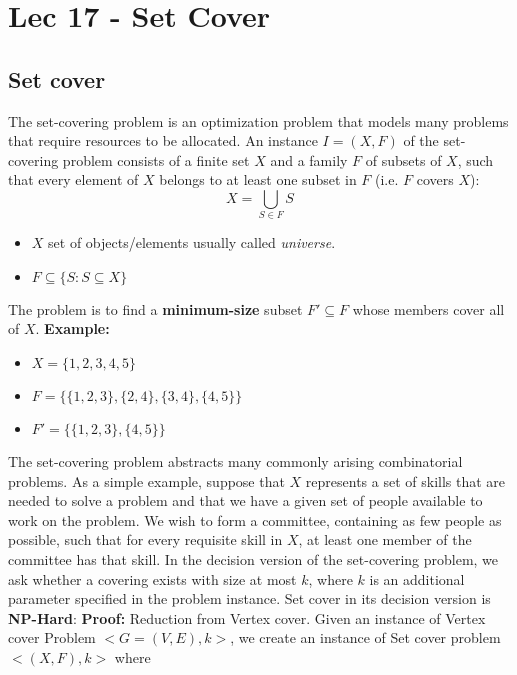 \chapter{Lec 17 - Set Cover}

\section{Set cover}
The set-covering problem is an optimization problem that models many problems that require resources to be allocated. An instance $I = (X, F)$ of the set-covering problem consists of a finite set $X$ and a family $F$ of subsets of $X$, such that every element of $X$ belongs to at least one subset in $F$ (i.e. $F$ covers $X$):
\[X = \bigcup_{S \in F}S\]
\begin{itemize}
    \item $X$ set of objects/elements usually called \textit{universe}.

    \item $F \subseteq \{S : S \subseteq X\}$
\end{itemize}
The problem is to find a \textbf{minimum-size} subset $F' \subseteq F$ whose members cover all of $X$.\newline\newline
\textbf{Example:}
\begin{itemize}
    \item $X = \{1,2,3,4,5\}$
    \item  $F = \{\{1,2,3\}, \{2,4\}, \{3,4\}, \{4,5\}\}$
    \item  $F' = \{\{1,2,3\}, \{4,5\}\}$
\end{itemize}
The set-covering problem abstracts many commonly arising combinatorial problems. As a simple example, suppose that $X$ represents a set of skills that are needed to solve a problem and that we have a given set of people available to work on the problem. We wish to form a committee, containing as few people as possible, such that for every requisite skill in $X$, at least one member of the committee has that skill. In the decision version of the set-covering problem, we ask whether a covering exists with size at most $k$, where $k$ is an additional parameter specified in the problem instance.\newline\newline
Set cover in its decision version is \textbf{NP-Hard}:\newline\newline
\textbf{Proof:} Reduction from Vertex cover. Given an instance of Vertex cover Problem $<G=(V,E), k>$, we create an instance of Set cover problem $<(X, F), k>$ where
